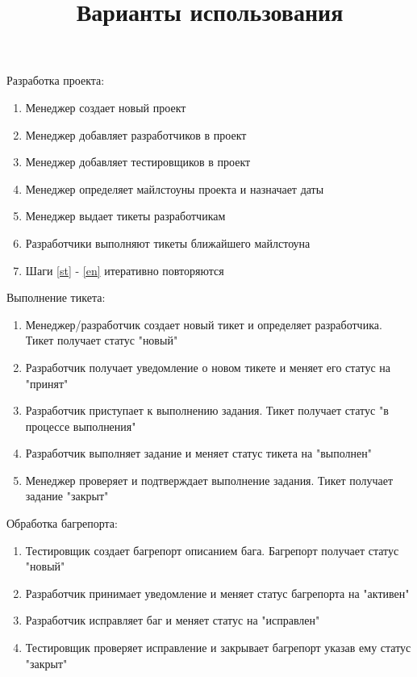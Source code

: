 \documentclass[12pt,a4paper]{article}
\begin{document}
\title{Варианты использования}
\maketitle

Разработка проекта:
\begin{enumerate}
\item Менеджер создает новый проект
\item Менеджер добавляет разработчиков в проект
\item Менеджер добавляет тестировщиков в проект
\item \label{st}Менеджер определяет майлстоуны проекта и назначает даты
\item Менеджер выдает тикеты разработчикам
\item \label{en}Разработчики выполняют тикеты ближайшего майлстоуна
\item Шаги \ref{st} - \ref{en} итеративно повторяются
\end{enumerate}

Выполнение тикета:
\begin{enumerate}
\item Менеджер/разработчик создает новый тикет и определяет разработчика. Тикет получает статус "новый"
\item Разработчик получает уведомление о новом тикете и меняет его статус на "принят"
\item Разработчик приступает к выполнению задания. Тикет получает статус "в процессе выполнения"
\item Разработчик выполняет задание и меняет статус тикета на "выполнен"
\item Менеджер проверяет и подтверждает выполнение задания. Тикет получает задание "закрыт" 
\end{enumerate}

Обработка багрепорта:
\begin{enumerate}
\item Тестировщик создает багрепорт описанием бага. Багрепорт получает статус "новый"
\item Разработчик принимает уведомление и меняет статус багрепорта на "активен"
\item Разработчик исправляет баг и меняет статус на "исправлен"
\item Тестировщик проверяет исправление и закрывает багрепорт указав ему статус "закрыт"
\end{enumerate}
\end{document}
